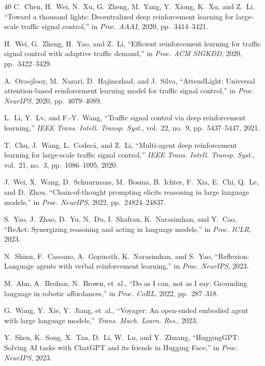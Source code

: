 \documentclass[conference]{IEEEtran}
\begin{document}
\begin{thebibliography}{40}
C.~Chen, H.~Wei, N.~Xu, G.~Zheng, M.~Yang, Y.~Xiong, K.~Xu, and Z.~Li, ``Toward a thousand lights: Decentralized deep reinforcement learning for large-scale traffic signal control,'' in \emph{Proc. AAAI}, 2020, pp.~3414--3421.

H.~Wei, G.~Zheng, H.~Yao, and Z.~Li, ``Efficient reinforcement learning for traffic signal control with adaptive traffic demand,'' in \emph{Proc. ACM SIGKDD}, 2020, pp.~3422--3429.

A.~Oroojlooy, M.~Nazari, D.~Hajinezhad, and J.~Silva, ``AttendLight: Universal attention-based reinforcement learning model for traffic signal control,'' in \emph{Proc. NeurIPS}, 2020, pp.~4079--4089.

L.~Li, Y.~Lv, and F.-Y.~Wang, ``Traffic signal control via deep reinforcement learning,'' \emph{IEEE Trans. Intell. Transp. Syst.}, vol.~22, no.~9, pp.~5437--5447, 2021.

T.~Chu, J.~Wang, L.~Codec\'{a}, and Z.~Li, ``Multi-agent deep reinforcement learning for large-scale traffic signal control,'' \emph{IEEE Trans. Intell. Transp. Syst.}, vol.~21, no.~3, pp.~1086--1095, 2020.

J.~Wei, X.~Wang, D.~Schuurmans, M.~Bosma, B.~Ichter, F.~Xia, E.~Chi, Q.~Le, and D.~Zhou, ``Chain-of-thought prompting elicits reasoning in large language models,'' in \emph{Proc. NeurIPS}, 2022, pp.~24824--24837.

S.~Yao, J.~Zhao, D.~Yu, N.~Du, I.~Shafran, K.~Narasimhan, and Y.~Cao, ``ReAct: Synergizing reasoning and acting in language models,'' in \emph{Proc. ICLR}, 2023.

N.~Shinn, F.~Cassano, A.~Gopinath, K.~Narasimhan, and S.~Yao, ``Reflexion: Language agents with verbal reinforcement learning,'' in \emph{Proc. NeurIPS}, 2023.

M.~Ahn, A.~Brohan, N.~Brown, et~al., ``Do as I can, not as I say: Grounding language in robotic affordances,'' in \emph{Proc. CoRL}, 2022, pp.~287--318.

G.~Wang, Y.~Xie, Y.~Jiang, et~al., ``Voyager: An open-ended embodied agent with large language models,'' \emph{Trans. Mach. Learn. Res.}, 2023.

Y.~Shen, K.~Song, X.~Tan, D.~Li, W.~Lu, and Y.~Zhuang, ``HuggingGPT: Solving AI tasks with ChatGPT and its friends in Hugging Face,'' in \emph{Proc. NeurIPS}, 2023.


\end{thebibliography}
\end{document}
